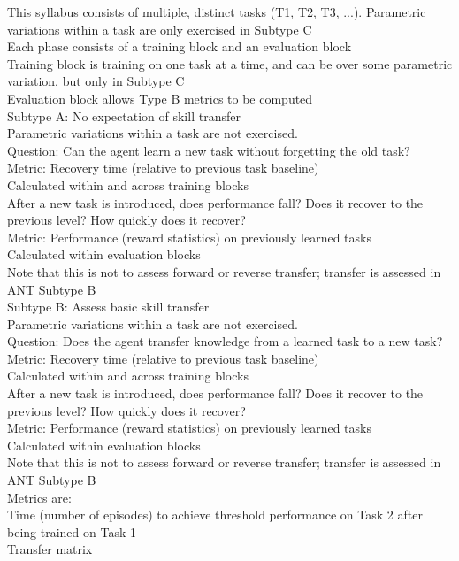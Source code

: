     This syllabus consists of multiple, distinct tasks  (T1, T2, T3, ...). Parametric variations within a task are only exercised in Subtype C\\
    Each phase consists of a training block and an evaluation block\\
        Training block is training on one task at a time, and can be over some parametric variation, but only in Subtype C\\
        Evaluation block allows Type B metrics to be computed\\

    Subtype A: No expectation of skill transfer\\
        Parametric variations within a task are not exercised.\\
            Question: Can the agent learn a new task without forgetting the old task?\\
                Metric: Recovery time (relative to previous task baseline)\\
                    Calculated within and across training blocks \\
                    After a new task is introduced, does performance fall? Does it recover to the previous level? How quickly does it recover? \\
                Metric: Performance (reward statistics) on previously learned tasks\\
                    Calculated within evaluation blocks\\
                    Note that this is not to assess forward or reverse transfer; transfer is assessed in ANT Subtype B\\
                    
    Subtype B: Assess basic skill transfer\\
        Parametric variations within a task are not exercised.\\
        Question: Does the agent transfer knowledge from a learned task to a new task?\\
            Metric: Recovery time (relative to previous task baseline)\\
                Calculated within and across training blocks \\
                After a new task is introduced, does performance fall? Does it recover to the previous level? How quickly does it recover? \\
            Metric: Performance (reward statistics) on previously learned tasks\\
                Calculated within evaluation blocks\\
                Note that this is not to assess forward or reverse transfer; transfer is assessed in ANT Subtype B\\
        Metrics are:\\
            Time (number of episodes) to achieve threshold performance on Task 2 after being trained on Task 1\\
            Transfer matrix\\
            
